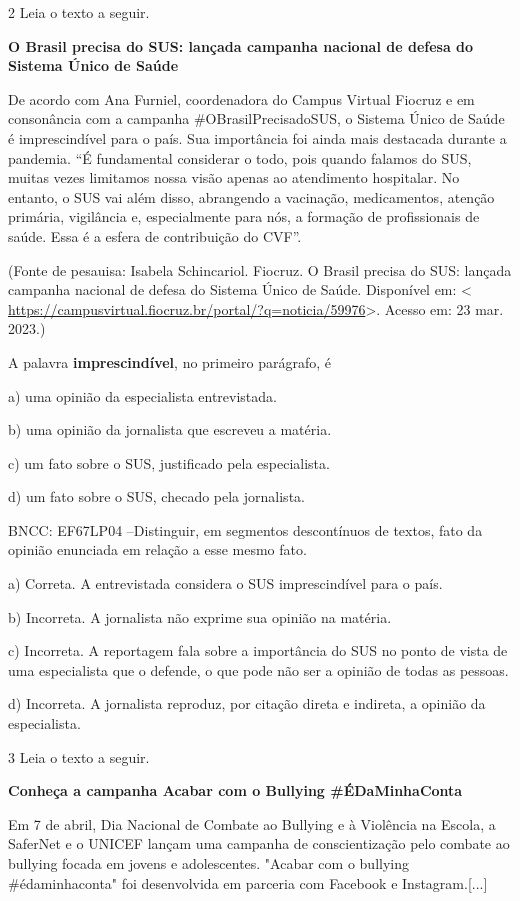 \num{2} Leia o texto a seguir.

\textbf{O Brasil precisa do SUS: lançada campanha nacional de defesa do
Sistema Único de Saúde}

De acordo com Ana Furniel, coordenadora do Campus Virtual Fiocruz e em
consonância com a campanha \#OBrasilPrecisadoSUS, o Sistema Único de
Saúde é imprescindível para o país. Sua importância foi ainda mais
destacada durante a pandemia. ``É fundamental considerar o todo, pois
quando falamos do SUS, muitas vezes limitamos nossa visão apenas ao
atendimento hospitalar. No entanto, o SUS vai além disso, abrangendo a
vacinação, medicamentos, atenção primária, vigilância e, especialmente
para nós, a formação de profissionais de saúde. Essa é a esfera de
contribuição do CVF''.

(Fonte de pesauisa: Isabela Schincariol. Fiocruz. O Brasil precisa do
SUS: lançada campanha nacional de defesa do Sistema Único de Saúde.
Disponível em: \textless{}
\url{https://campusvirtual.fiocruz.br/portal/?q=noticia/59976}\textgreater.
Acesso em: 23 mar. 2023.)

A palavra \textbf{imprescindível}, no primeiro parágrafo, é

a) uma opinião da especialista entrevistada.

b) uma opinião da jornalista que escreveu a matéria.

c) um fato sobre o SUS, justificado pela especialista.

d) um fato sobre o SUS, checado pela jornalista.

BNCC: EF67LP04 --Distinguir, em segmentos descontínuos de textos, fato
da opinião enunciada em relação a esse mesmo fato.

a) Correta. A entrevistada considera o SUS imprescindível para o país.

b) Incorreta. A jornalista não exprime sua opinião na matéria.

c) Incorreta. A reportagem fala sobre a importância do SUS no ponto de
vista de uma especialista que o defende, o que pode não ser a opinião de
todas as pessoas.

d) Incorreta. A jornalista reproduz, por citação direta e indireta, a
opinião da especialista.

\num{3} Leia o texto a seguir.

\textbf{Conheça a campanha Acabar com o Bullying \#ÉDaMinhaConta}

Em 7 de abril, Dia Nacional de Combate ao Bullying e à Violência na
Escola, a SaferNet e o UNICEF lançam uma campanha de conscientização
pelo combate ao bullying focada em jovens e adolescentes. "Acabar com o
bullying \#édaminhaconta" foi desenvolvida em parceria com Facebook e
Instagram.{[}...{]}

